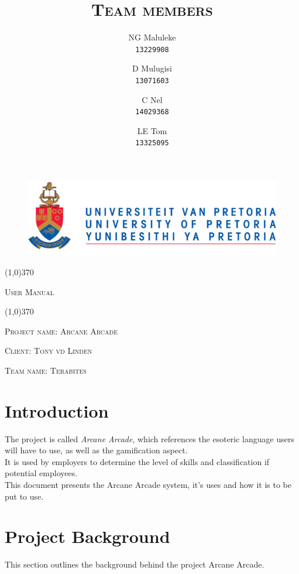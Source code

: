 \documentclass[english]{article}
\title{\scshape\Large Team members}
\author{
	NG Maluleke\\
	\texttt{13229908}
	\and
	D Mulugisi\\
	\texttt{13071603}
	\and
	C Nel\\
	\texttt{14029368}
	\and
	LE Tom\\
	\texttt{13325095}
}
\begin{document}
	
	\begin{figure}
		\includegraphics[width=\linewidth]{up_logo.png}
	\end{figure}
	
	\begin{center}
	 \line(1,0){370}
	\\[0.2cm]
    {\scshape\Large User Manual \par}
	\vspace{0.1cm}
	\line(1,0){370}
	\\[0.8cm]
	
	{\scshape\large Project name: Arcane Arcade\par}	
	\vspace{1cm}
	{\scshape\large Client: Tony vd Linden\par}
	\vspace{1cm}
	{\scshape\large Team name: Terabites\par}
	\vspace{1cm}
	{\let\newpage\relax\maketitle}
	\end{center}
	
	
	\newpage
	\tableofcontents

	\newpage
	
	\section{Introduction}
		 The project is called \textit{Arcane Arcade}, which references the esoteric language users will have to use, as well as the gamification aspect.
		 \\[12pt]
		It is used by employers to determine the level of skills and classification if potential employees. 
		 \\[12pt]
		 This document presents the Arcane Arcade system, it's uses and how it is to be put to use.

	\section{Project Background}
	This section outlines the background behind the project Arcane Arcade.
\end{document}

